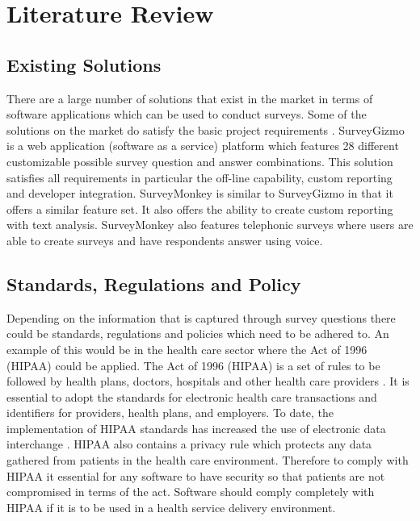 \documentclass[12pt]{witseiepaper}
\begin{document}
\section{Literature Review}
\subsection{Existing Solutions}
There are a large number of solutions that exist in the market in terms of software applications which can be used to conduct surveys. Some of the solutions on the market do satisfy the basic project requirements \cite{ReviewSurvey}. SurveyGizmo \cite{SurveyGizmo} is a web application (software as a service) platform which features 28 different customizable possible survey question and answer combinations. This solution satisfies all requirements in particular the off-line capability, custom reporting and developer integration. SurveyMonkey \cite{SurveyMonkey} is similar to SurveyGizmo in that it offers a similar feature set. It also offers the ability to create custom reporting with text analysis. SurveyMonkey also features telephonic surveys where users are able to create surveys and have respondents answer using voice. 



\subsection{Standards, Regulations and Policy}
Depending on the information that is captured through survey questions there could be standards, regulations and policies which need to be adhered to. An example of this would be in the health care sector where the Act of 1996 (HIPAA) could be applied. The Act of 1996 (HIPAA) is a set of rules to be followed by health plans, doctors, hospitals and other health care providers \cite{HIPAA}. It is essential to adopt the standards for electronic health care transactions and identifiers for providers, health plans, and employers. To date, the implementation of HIPAA standards has increased the use of electronic data interchange \cite{HIPAA}. HIPAA also contains a privacy rule which protects any data gathered from patients in the health care environment. Therefore to comply with HIPAA it essential for any software to have security so that patients are not compromised in terms of the act. Software should comply completely with HIPAA if it is to be used in a health service delivery environment. \\
\end{document}
